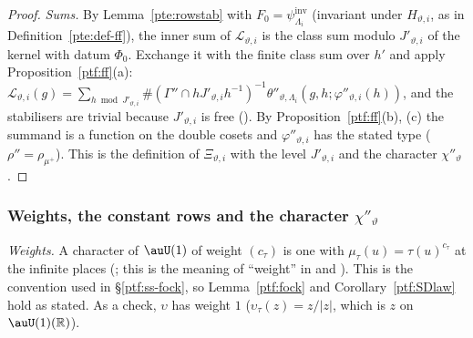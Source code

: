 \documentclass[10pt]{amsart}
\theoremstyle{definition}
\theoremstyle{remark}
\newcommand{\R}{\mathbb R}
\begin{document}
\begin{proof}
\emph{Sums.} By Lemma~\ref{pte:rowstab} with $F_0=\psi^{\mathrm{inv}}_{\Lambda_i}$ (invariant under $H_{\vartheta,i}$, as in
Definition~\ref{pte:def-ff}), the inner sum of $\mathcal L_{\vartheta,i}$ is the class sum modulo $J'_{\vartheta,i}$ of the kernel with
datum $\Phi_0$. Exchange it with the finite class sum over $h'$ and apply Proposition~\ref{ptf:ff}(a): $\mathcal L_{\vartheta,i}(g)
=\sum_{h\bmod J'_{\vartheta,i}}\#(\Gamma''\cap hJ'_{\vartheta,i}h^{-1})^{-1}\theta''_{\vartheta,\Lambda_i}(g,h;\varphi''_{\vartheta,i}(h))$, and the stabilisers are
trivial because $J'_{\vartheta,i}$ is free ({\cite[Lemma~14.5]{P46}}). By Proposition~\ref{ptf:ff}(b), (c) the summand is a
function on the double cosets and $\varphi''_{\vartheta,i}$ has the stated type ($\rho''=\rho_{\mu^+}$). This is the definition of
$\Xi_{\vartheta,i}$ with the level $J'_{\vartheta,i}$ and the character $\chi''_\vartheta$.
\end{proof}


\subsubsection{Weights, the constant rows and the character $\chi''_\vartheta$}\label{ptf:ss-close}

\emph{Weights.} A character of $\auU(1)$ of weight $(c_\tau)$ is one with $\mu_\tau(u)=\tau(u)^{c_\tau}$ at the
infinite places ({\cite[Lemma~8.6]{P49}}; this is the meaning of ``weight'' in {\cite[\S14.3]{P46}} and
{\cite[\S3.1.1]{P53}}). This is the convention used in \S\ref{ptf:ss-fock}, so Lemma~\ref{ptf:fock} and
Corollary~\ref{ptf:SDlaw} hold as stated. As a check, $\upsilon$ has weight $1$ ($\upsilon_\tau(z)=z/|z|$, which is
$z$ on $\auU(1)(\R)$).
\end{document}
